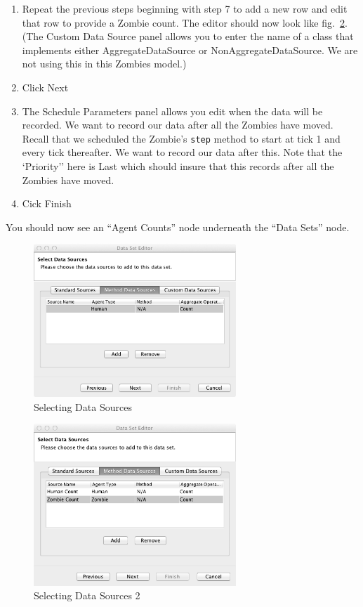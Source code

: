 \documentclass[11pt]{amsart}
\begin{document}
\begin{enumerate}
\item Repeat the previous steps beginning with step 7 to add a new row and edit that row to provide a Zombie count. The editor should now look like fig.~\ref{fig:data2}. (The Custom Data Source panel allows you to enter the name of a class that implements either AggregateDataSource or NonAggregateDataSource. We are not using this in this Zombies model.)
\item Click Next
\item The Schedule Parameters panel allows you edit when the data will be recorded. We want to record our data after all the Zombies have moved. Recall that we scheduled the Zombie's \texttt{step} method to start at tick 1 and every tick thereafter. We want to record our data after this. Note that the `Priority'' here is Last which should insure that this records after all the Zombies have moved.
\item Cick Finish
\end{enumerate}
\vspace{.2in}

You should now see an ``Agent Counts'' node underneath the ``Data Sets'' node. \\

\begin{figure}[h]
\begin{center}
\vspace{.2in}
\centerline {
\includegraphics[width=3in]{GettingStartedImages/data1.png}
}
\caption{Selecting Data Sources}
\label{fig:data1}
\end{center}
\end{figure}

\begin{figure}[h]
\begin{center}
\vspace{.2in}
\centerline {
\includegraphics[width=3in]{GettingStartedImages/data2.png}
}
\caption{Selecting Data Sources 2}
\label{fig:data2}
\end{center}
\end{figure}
\end{document}
